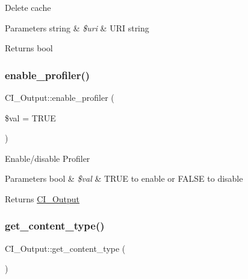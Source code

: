 Delete cache


\begin{DoxyParams}[1]{Parameters}
string & {\em \$uri} & U\+RI string \\
\hline
\end{DoxyParams}
\begin{DoxyReturn}{Returns}
bool 
\end{DoxyReturn}
\mbox{\label{class_c_i___output_af0baa342f5a2f1b9111ae3e6b679ccf6}} 
\subsubsection{\texorpdfstring{enable\+\_\+profiler()}{enable\_profiler()}}
{\footnotesize\ttfamily C\+I\+\_\+\+Output\+::enable\+\_\+profiler (\begin{DoxyParamCaption}\item[{}]{\$val = {\ttfamily TRUE} }\end{DoxyParamCaption})}

Enable/disable Profiler


\begin{DoxyParams}[1]{Parameters}
bool & {\em \$val} & T\+R\+UE to enable or F\+A\+L\+SE to disable \\
\hline
\end{DoxyParams}
\begin{DoxyReturn}{Returns}
\mbox{\hyperlink{class_c_i___output}{C\+I\+\_\+\+Output}} 
\end{DoxyReturn}
\mbox{\label{class_c_i___output_a0c257f7a16a24b7e4d6d337b35137430}} 
\subsubsection{\texorpdfstring{get\+\_\+content\+\_\+type()}{get\_content\_type()}}
{\footnotesize\ttfamily C\+I\+\_\+\+Output\+::get\+\_\+content\+\_\+type (\begin{DoxyParamCaption}{ }\end{DoxyParamCaption})}

